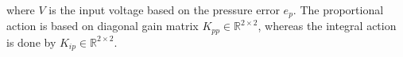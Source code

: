 where $V$ is the input voltage based on the pressure error $e_p$. The proportional action is based on diagonal gain matrix $K_{pp} \in \mathbb{R}^{2\times 2}$, whereas the integral action is done by $K_{ip} \in \mathbb{R}^{2\times 2}$.





















































